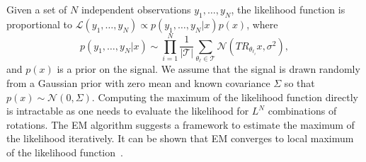 \documentclass[english,12pt]{article}
\numberwithin{equation}{section}
\numberwithin{thm}{section} %
\begin{document}
Given a set of $N$ independent observations $y_1,\ldots,y_N$, the likelihood function  is proportional to $\mathcal{L}(y_1,\ldots,y_N) \propto	 p(y_1,\ldots,y_N|x)p(x)$, where  
\begin{equation} \label{eq:likelihood}
p(y_1,\ldots,y_N|x)\sim \prod_{i=1}^N\frac{1}{|\mathcal{T}|}\sum_{{\theta_\ell}\in\mathcal{T}}\mathcal{N}(T R_{\theta_{\ell_i}}x,\sigma^2),
\end{equation}
and $p(x)$ is a prior on the signal. 
We assume that the signal is drawn randomly from a Gaussian prior with zero mean and known covariance $\Sigma$ so that ${p(x)\sim\mathcal{N}(0,\Sigma)}$. 
Computing the maximum of the likelihood function directly is intractable
as one needs to evaluate the likelihood for $L^N$ combinations of  rotations. The EM algorithm suggests a framework to  estimate the maximum of the likelihood iteratively. It can be shown that EM converges to local maximum of the likelihood function~\cite{dempster1977maximum}. 
\end{document}
